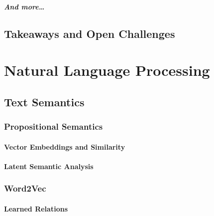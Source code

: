 		\paragraph{And more\dots} %

	\section{Takeaways and Open Challenges} %

\chapter{Natural Language Processing} %

	\section{Text Semantics} %

		\subsection{Propositional Semantics} %

			\subsubsection{Vector Embeddings and Similarity} %

			\subsubsection{Latent Semantic Analysis} %

		\subsection{Word2Vec} %

			\subsubsection{Learned Relations} %

